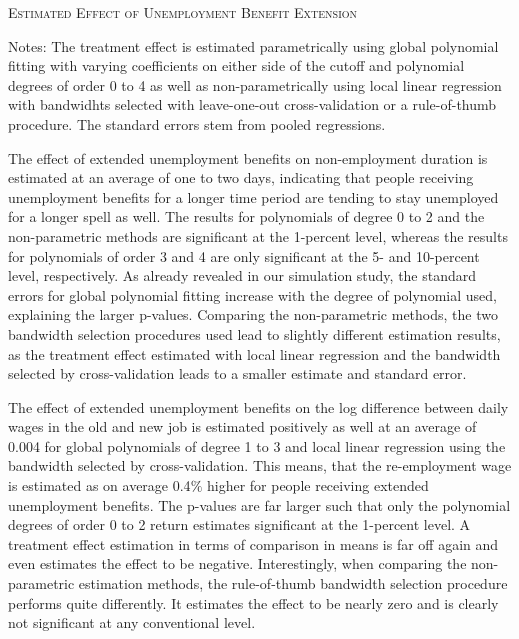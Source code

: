 \begin{table}[H]
	\centering
	\hspace{\fill}
	
	\caption{\textsc{Estimated Effect of Unemployment Benefit Extension}}
	\label{tab: estim_ui_benefits}
	\medskip
	\justify
	\footnotesize{Notes: The treatment effect is estimated parametrically using global polynomial fitting with varying coefficients on either side of the cutoff and polynomial degrees of order 0 to 4 as well as non-parametrically using local linear regression with bandwidhts selected with leave-one-out cross-validation or a rule-of-thumb procedure. The standard errors stem from pooled regressions.}
\end{table}

The effect of extended unemployment benefits on non-employment duration is estimated at an average of one to two days, indicating that people receiving unemployment benefits for a longer time period are tending to stay unemployed for a longer spell as well. The results for polynomials of degree 0 to 2 and the non-parametric methods are significant at the 1-percent level, whereas the results for polynomials of order 3 and 4 are only significant at the 5- and 10-percent level, respectively. As already revealed in our simulation study, the standard errors for global polynomial fitting increase with the degree of polynomial used, explaining the larger p-values. Comparing the non-parametric methods, the two bandwidth selection procedures used lead to slightly different estimation results, as the treatment effect estimated with local linear regression and the bandwidth selected by cross-validation leads to a smaller estimate and standard error.

The effect of extended unemployment benefits on the log difference between daily wages in the old and new job is estimated positively as well at an average of 0.004 for global polynomials of degree 1 to 3 and local linear regression using the bandwidth selected by cross-validation. This means, that the re-employment wage is estimated as on average 0.4$\%$ higher for people receiving extended unemployment benefits. The p-values are far larger such that only the polynomial degrees of order 0 to 2 return estimates significant at the 1-percent level. A treatment effect estimation in terms of comparison in means is far off again and even estimates the effect to be negative. Interestingly, when comparing the non-parametric estimation methods, the rule-of-thumb bandwidth selection procedure performs quite differently. It estimates the effect to be nearly zero and is clearly not significant at any conventional level.

